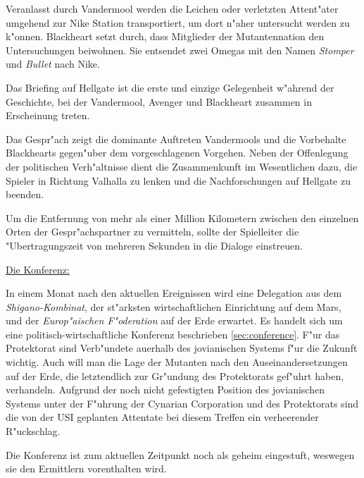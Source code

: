 Veranlasst durch Vandermool werden die Leichen oder verletzten Attent"ater umgehend zur Nike Station transportiert, um dort n"aher untersucht werden zu k"onnen. Blackheart setzt durch, dass Mitglieder der Mutantennation den Untersuchungen beiwohnen. Sie entsendet zwei Omegas mit den Namen \emph{Stomper} und \emph{Bullet} nach Nike.

\begin{remarks}
	Das Briefing auf Hellgate ist die erste und einzige Gelegenheit w"ahrend der Geschichte, bei der Vandermool, Avenger und Blackheart zusammen in Erscheinung treten.


	Das Gespr"ach zeigt die dominante Auftreten Vandermools und die Vorbehalte Blackhearts gegen"uber dem vorgeschlagenen Vorgehen. Neben der Offenlegung der politischen Verh"altnisse dient die Zusammenkunft im Wesentlichen dazu, die Spieler in Richtung Valhalla zu lenken und die Nachforschungen auf Hellgate zu beenden.

	Um die Entfernung von mehr als einer Million Kilometern zwischen den einzelnen Orten der Gespr"achspartner zu vermitteln, sollte der Spielleiter die "Ubertragungszeit von mehreren Sekunden in die Dialoge einstreuen.

	\underline{Die Konferenz:}

	In einem Monat nach den aktuellen Ereignissen wird eine Delegation aus dem \emph{Shigano-Kombinat}, der st"arksten wirtschaftlichen Einrichtung auf dem Mars, und der \emph{Europ"aischen F"oderation} auf der Erde erwartet.  Es handelt sich um eine 
	politisch-wirtschaftliche Konferenz beschrieben \cref{sec:conference}. F"ur das Protektorat sind Verb"undete au\3erhalb des jovianischen Systems f"ur die Zukunft wichtig. Auch will man die Lage der Mutanten nach den Auseinandersetzungen auf der Erde, die letztendlich zur Gr"undung des Protektorats gef"uhrt haben, verhandeln. Aufgrund der noch nicht gefestigten Position des jovianischen Systems unter der F"uhrung der Cynarian Corporation und des Protektorats sind die von der USI geplanten Attentate bei diesem Treffen ein verheerender R"uckschlag.
	
	Die Konferenz ist zum aktuellen Zeitpunkt noch als geheim eingestuft, weswegen sie den Ermittlern vorenthalten wird.
\end{remarks}
